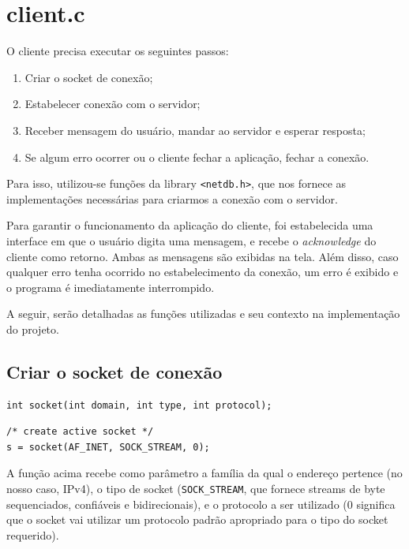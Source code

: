 \documentclass[10pt,twocolumn,letterpaper]{article}
\begin{document}
\section{client.c}
O cliente precisa executar os seguintes passos:

\begin{enumerate}
    \item Criar o socket de conexão;
    \item Estabelecer conexão com o servidor;
    \item Receber mensagem do usuário, mandar ao servidor e esperar resposta;
    \item Se algum erro ocorrer ou o cliente fechar a aplicação, fechar a conexão.
\end{enumerate}

 Para isso, utilizou-se funções da library \texttt{<netdb.h>}, que nos fornece 
 as implementações necessárias para criarmos a conexão com o servidor. 

 Para garantir o funcionamento da aplicação do cliente, foi estabelecida uma 
 interface em que o usuário digita uma mensagem, e recebe o \textit{acknowledge} 
 do cliente como retorno. Ambas as mensagens são exibidas na tela. Além disso, 
 caso qualquer erro tenha ocorrido no estabelecimento da conexão, um erro é 
 exibido e o programa é imediatamente interrompido.

 A seguir, serão detalhadas as funções utilizadas e seu contexto na 
 implementação do projeto.

\subsection{Criar o socket de conexão}

	\begin{lstlisting}[caption={Função utilizada para criação do socket}, label=Algorithm]
int socket(int domain, int type, int protocol);
	\end{lstlisting}

	\begin{lstlisting}[caption={Aplicação da função na implementação do projeto}, label=Algorithm]
/* create active socket */
s = socket(AF_INET, SOCK_STREAM, 0);
	\end{lstlisting}

	A função acima recebe como parâmetro a família da qual o endereço pertence (no nosso caso, IPv4), o tipo de socket (\texttt{SOCK\_STREAM}, que fornece streams de byte sequenciados, confiáveis e bidirecionais), e o protocolo a ser utilizado (0 significa que o socket vai utilizar um protocolo padrão apropriado para o tipo do socket requerido). \\
\end{document}
